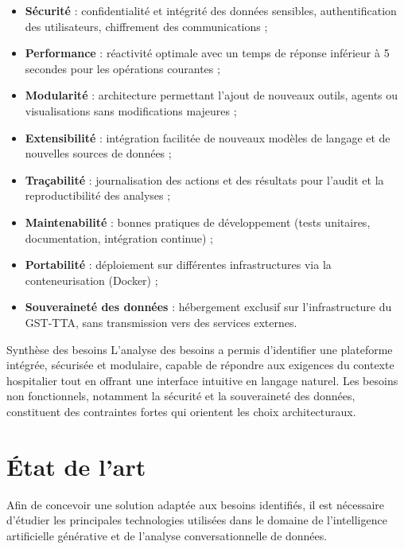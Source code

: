 \begin{itemize}
  \item \textbf{Sécurité} : confidentialité et intégrité des données sensibles, authentification des utilisateurs, chiffrement des communications ;
  \item \textbf{Performance} : réactivité optimale avec un temps de réponse inférieur à 5 secondes pour les opérations courantes ;
  \item \textbf{Modularité} : architecture permettant l'ajout de nouveaux outils, agents ou visualisations sans modifications majeures ;
  \item \textbf{Extensibilité} : intégration facilitée de nouveaux modèles de langage et de nouvelles sources de données ;
  \item \textbf{Traçabilité} : journalisation des actions et des résultats pour l'audit et la reproductibilité des analyses ;
  \item \textbf{Maintenabilité} : bonnes pratiques de développement (tests unitaires, documentation, intégration continue) ;
  \item \textbf{Portabilité} : déploiement sur différentes infrastructures via la conteneurisation (Docker) ;
  \item \textbf{Souveraineté des données} : hébergement exclusif sur l'infrastructure du GST-TTA, sans transmission vers des services externes.
\end{itemize}

\begin{infobox}{Synthèse des besoins}
L'analyse des besoins a permis d'identifier une plateforme intégrée, sécurisée et modulaire, capable de répondre aux exigences du contexte hospitalier tout en offrant une interface intuitive en langage naturel. Les besoins non fonctionnels, notamment la sécurité et la souveraineté des données, constituent des contraintes fortes qui orientent les choix architecturaux.
\end{infobox}

\section{État de l'art}

Afin de concevoir une solution adaptée aux besoins identifiés, il est nécessaire d'étudier les principales technologies utilisées dans le domaine de l'intelligence artificielle générative et de l'analyse conversationnelle de données.

